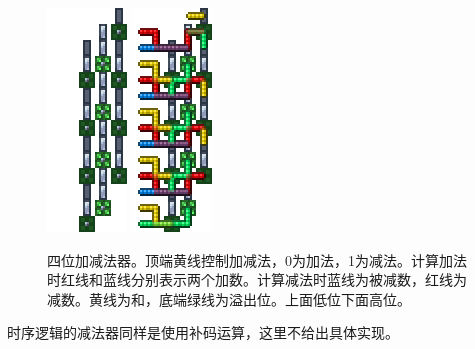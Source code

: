 \begin{figure}[!ht]
\centering
\includegraphics{images/412.png}
\qquad
\includegraphics{images/413.png}
\caption{四位加减法器。顶端黄线控制加减法，0为加法，1为减法。计算加法时红线和蓝线分别表示两个加数。计算减法时蓝线为被减数，红线为减数。黄线为和，底端绿线为溢出位。上面低位下面高位。}\label{fig39}
\end{figure}

时序逻辑的减法器同样是使用补码运算，这里不给出具体实现。

